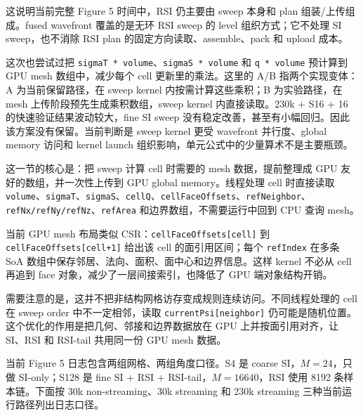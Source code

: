 \documentclass[10pt]{article}
\newcommand{\sect}[1]{\vspace{3mm}{\sffamily\Large\bfseries\color{titleblue} #1}\par\vspace{1mm}{\color{titleblue}\rule{\linewidth}{0.45pt}}\vspace{1mm}}
\newcommand{\subsect}[1]{\vspace{2mm}{\sffamily\large\bfseries #1}\par}
\newcommand{\code}[1]{\texttt{#1}}
\begin{document}
这说明当前完整 Figure 5 时间中，RSI 仍主要由 sweep 本身和 plan 组装/上传组成。fused wavefront 覆盖的是无环 RSI sweep 的 level 组织方式；它不处理 SI sweep，也不消除 RSI plan 的固定方向读取、assemble、pack 和 upload 成本。

这次也尝试过把 \code{sigmaT * volume}、\code{sigmaS * volume} 和 \code{q * volume} 预计算到 GPU mesh 数组中，减少每个 cell 更新里的乘法。这里的 A/B 指两个实现变体：A 为当前保留路径，在 sweep kernel 内按需计算这些乘积；B 为实验路径，在 mesh 上传阶段预先生成乘积数组，sweep kernel 内直接读取。230k + S16 + 16 的快速验证结果波动较大，fine SI sweep 没有稳定改善，甚至有小幅回归。因此该方案没有保留。当前判断是 sweep kernel 更受 wavefront 并行度、global memory 访问和 kernel launch 组织影响，单元公式中的少量算术不是主要瓶颈。

\sect{7. Mesh 数据布局优化}

这一节的核心是：把 sweep 计算 cell 时需要的 mesh 数据，提前整理成 GPU 友好的数组，并一次性上传到 GPU global memory。线程处理 cell 时直接读取 \code{volume}、\code{sigmaT}、\code{sigmaS}、\code{cellQ}、\code{cellFaceOffsets}、\code{refNeighbor}、\code{refNx/refNy/refNz}、\code{refArea} 和边界数组，不需要运行中回到 CPU 查询 mesh。

当前 GPU mesh 布局类似 CSR：\code{cellFaceOffsets[cell]} 到 \code{cellFaceOffsets[cell+1]} 给出该 cell 的面引用区间；每个 \code{refIndex} 在多条 SoA 数组中保存邻居、法向、面积、面中心和边界信息。这样 kernel 不必从 cell 再追到 face 对象，减少了一层间接索引，也降低了 GPU 端对象结构开销。

需要注意的是，这并不把非结构网格访存变成规则连续访问。不同线程处理的 cell 在 sweep order 中不一定相邻，读取 \code{currentPsi[neighbor]} 仍可能是随机位置。这个优化的作用是把几何、邻接和边界数据放在 GPU 上并按面引用对齐，让 SI、RSI 和 RSI-tail 共用同一份 GPU mesh 数据。

\sect{8. 当前性能口径}

当前 Figure 5 日志包含两组网格、两组角度口径。S4 是 coarse SI，$M=24$，只做 SI-only；S128 是 fine SI + RSI + RSI-tail，$M=16640$，RSI 使用 8192 条样本链。下面按 30k non-streaming、30k streaming 和 230k streaming 三种当前运行路径列出日志口径。

\subsect{8.0 计时字段说明}
\end{document}
